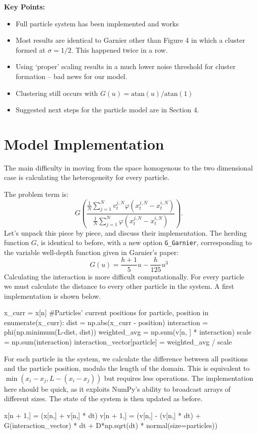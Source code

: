 \documentclass[11pt,a4paper, final, dvipsnames]{article}
\begin{document}
    {\large \textbf{Key Points:}}
    \begin{itemize}
        \item Full particle system has been implemented and works
        \item Most results are identical to Garnier other than Figure 4 in which a cluster formed at $\sigma = 1/2$. This happened twice in a row.
        \item Using `proper' scaling results in a much lower noise threshold for cluster formation -- bad news for our model.
        \item Clustering still occurs with $G(u) = \mathrm{atan}(u)/\mathrm{atan}(1)$ 
        \item Suggested next steps for the particle model are in Section 4.
    \end{itemize}
    \section{Model Implementation}
        The main difficulty in moving from the space homogenous to the two dimensional case is calculating the heterogeneity for every particle.
        
        The problem term is:
        \begin{equation}\label{interaction}
            G\left(\frac{\frac{1}{N}\sum_{j=1}^N v_t^{j,N}\varphi(x^{j,N}_t-x^{i,N}_t)}{\frac{1}{N}\sum_{j=1}^N \varphi(x^{j,N}_t-x^{i,N}_t)}\right).
        \end{equation}
        Let's unpack this piece by piece, and discuss their implementation. The herding function $G$, is identical to before, with a new option \texttt{G\_Garnier}, corresponding to the variable well-depth function given in Garnier's paper:
        $$G(u) = \frac{h+1}{5}u - \frac{h}{125} u^3$$
        Calculating the interaction is more difficult computationally. For every particle we must calculate the distance to every other particle in the system. A first implementation is shown below.

        \begin{python}
x_curr = x[n] #Particles' current positions
   for particle, position in enumerate(x_curr):
       dist = np.abs(x_curr - position)
       interaction = phi(np.minimum(L-dist, dist))
       weighted_avg = np.sum(v[n, ] * interaction)
       scale = np.sum(interaction)
       interaction_vector[particle] = weighted_avg / scale
        \end{python}
        For each particle in the system, we calculate the difference between all positions and the particle position, modulo the length of the domain. This is equivalent to $\min(x_i-x_j, L-(x_i-x_j))$ but requires less operations. The implementation here should be quick, as it exploits NumPy's ability to broadcast arrays of different sizes. The state of the system is then updated as before.
        \begin{python}
x[n + 1,] = (x[n,] + v[n,] * dt) %
v[n + 1,] = (v[n,] - (v[n,] * dt) + G(interaction_vector) * dt
            + D*np.sqrt(dt) * normal(size=particles))
        \end{python}
        
\end{document}
